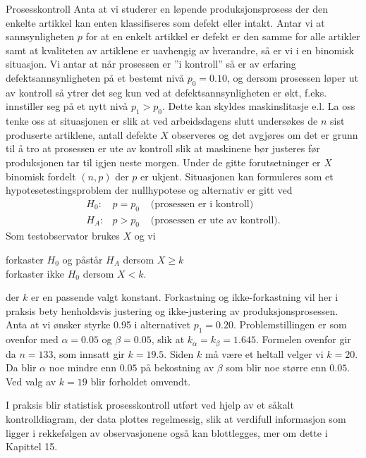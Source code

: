 \begin{eksempel}{Prosesskontroll}
Anta at vi studerer en løpende produksjonsprosess der den enkelte
artikkel kan enten klassifiseres som defekt eller intakt. Antar
vi at sannsynligheten $p$ for at en enkelt artikkel er defekt er
den samme for alle artikler samt at kvaliteten av artiklene er
uavhengig av hverandre, så er vi i en binomisk situasjon. Vi
antar at når prosessen er ''i kontroll'' så er av erfaring
defektsannsynligheten på et bestemt nivå $p_0=0.10$, og dersom
prosessen løper ut av kontroll så ytrer det seg kun ved at
defektsannsynligheten er økt, f.eks. innstiller seg på et nytt
nivå $p_1>p_0$. Dette kan skyldes maskinslitasje e.l. La oss
tenke oss at situasjonen er slik at ved arbeidsdagens slutt
undersøkes de $n$ sist produserte artiklene, antall defekte $X$
observeres og det avgjøres om det er grunn til å tro at prosessen
er ute av kontroll slik at maskinene bør justeres før
produksjonen tar til igjen neste morgen. Under de gitte
forutsetninger er $X$ binomisk fordelt $(n,p)$ der $p$ er ukjent.
Situasjonen kan formuleres som et hypotesetestingsproblem der
nullhypotese og alternativ er gitt ved
\begin{eqnarray*}
H_0: & p=p_0  & \mbox{ (prosessen er i kontroll)} \\
H_A: & p>p_0  & \mbox{ (prosessen er ute av kontroll).}
\end{eqnarray*}
Som testobservator brukes $X$ og vi
\begin{center}
forkaster $H_0$ og påstår $H_A$ dersom $X\geq k$\\
forkaster ikke $H_0$ dersom             $X<k$.
\end{center}
der $k$ er en passende valgt konstant. Forkastning og ikke-forkastning
vil her i praksis bety henholdsvis justering og ikke-justering av
produksjons\-prosessen. 
Anta at vi ønsker styrke 0.95 i alternativet $p_1=0.20$.
Problemstillingen er som ovenfor med $\alpha=0.05$ og $\beta=0.05$, slik at 
$k_{\alpha}=k_{\beta}=1.645$. Formelen ovenfor gir da $n=133$, som innsatt
gir $k=19.5$. Siden $k$ må være et heltall velger vi $k=20$.
Da blir $\alpha$ noe mindre enn $0.05$ på bekostning av $\beta$ som blir
 noe større enn $0.05$. Ved valg av $k=19$ blir forholdet omvendt.

I praksis blir statistisk prosesskontroll utført ved hjelp av
et såkalt kontrolldiagram, der data plottes regelmessig,
slik at verdifull informasjon som ligger i rekkefølgen
av observasjonene også kan blottlegges, mer om dette i Kapittel 15.
\end{eksempel}


